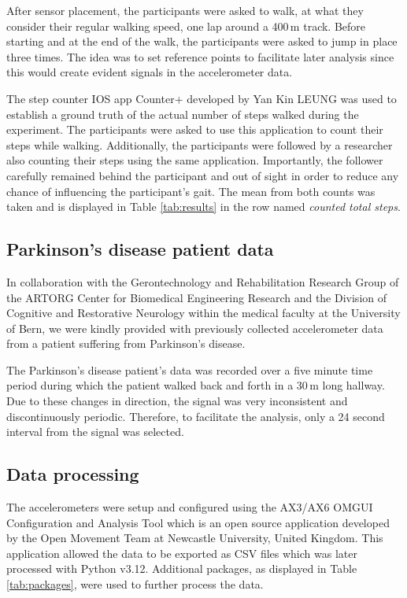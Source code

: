 After sensor placement, the participants were asked to walk, at what they consider their regular walking speed, one lap around a 400\,m track. Before starting and at the end of the walk, the participants were asked to jump in place three times. The idea was to set reference points to facilitate later analysis since this would create evident signals in the accelerometer data.

The step counter IOS app Counter+ developed by Yan Kin LEUNG was used to establish a ground truth of the actual number of steps walked during the experiment. The participants were asked to use this application to count their steps while walking. Additionally, the participants were followed by a researcher also counting their steps using the same application. Importantly, the follower carefully remained behind the participant and out of sight in order to reduce any chance of influencing the participant's gait. The mean from both counts was taken and is displayed in Table \ref{tab:results} in the row named \emph{counted total steps}.

\subsection{Parkinson's disease patient data}
In collaboration with the Gerontechnology and Rehabilitation Research Group of the ARTORG Center for Biomedical Engineering Research and the Division of Cognitive and Restorative Neurology within the medical faculty at the University of Bern, we were kindly provided with previously collected accelerometer data from a patient suffering from Parkinson's disease. 

The Parkinson's disease patient's data was recorded over a five minute time period during which the patient walked back and forth in a 30\,m long hallway. Due to these changes in direction, the signal was very inconsistent and discontinuously periodic. Therefore, to facilitate the analysis, only a 24 second interval from the signal was selected.


\subsection{Data processing}
The accelerometers were setup and configured using the AX3/AX6 OMGUI Configuration and Analysis Tool which is an open source application developed by the Open Movement Team at Newcastle University, United Kingdom. This application allowed the data to be exported as CSV files which was later processed with Python v3.12. Additional packages, as displayed in Table \ref{tab:packages}, were used to further process the data.

